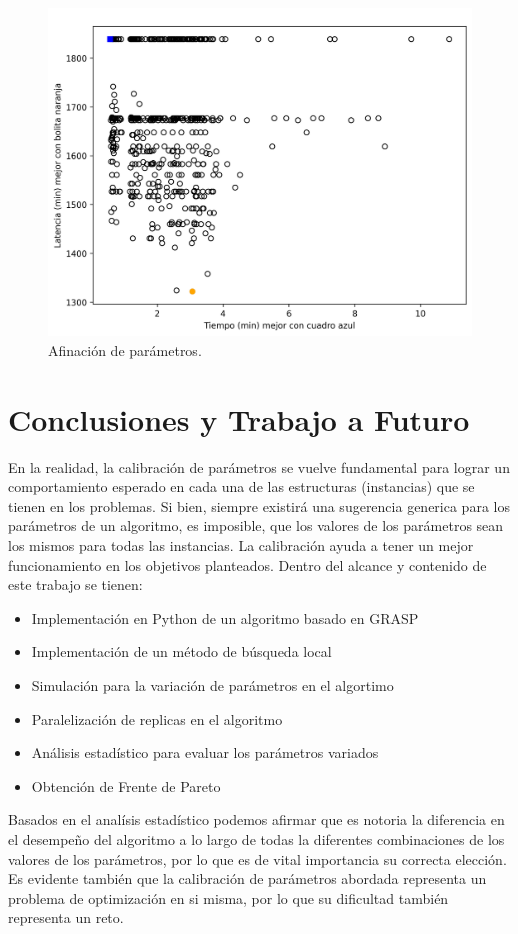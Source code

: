 \documentclass[review]{elsarticle}
\begin{document}
 \begin{figure}[h!]
	\centering
	\includegraphics[width=0.7\linewidth]{10_A_mejores.png}
	\caption{Afinación de parámetros.}
	\label{fig:imagen4}
	
\end{figure}



\section{Conclusiones y Trabajo a Futuro}

En la realidad, la calibración de parámetros se vuelve fundamental para lograr un comportamiento esperado en cada una de las estructuras (instancias) que se tienen en los problemas. Si bien, siempre existirá una sugerencia generica para los parámetros de un algoritmo, es imposible, que los valores de los parámetros sean los mismos para todas las instancias. La calibración ayuda a tener un mejor funcionamiento en los objetivos planteados.
Dentro del alcance y contenido de este trabajo se tienen:	
\begin{itemize}
\item Implementación en Python de un algoritmo basado en GRASP
\item Implementación de un método de búsqueda local
\item Simulación para la variación de parámetros en el algortimo
\item Paralelización de replicas en el algoritmo
\item Análisis estadístico para evaluar los parámetros variados
\item Obtención de Frente de Pareto
\end{itemize}

Basados en el analísis estadístico podemos afirmar que es notoria la diferencia en el desempeño del algoritmo a lo largo de todas la diferentes combinaciones de los valores de los parámetros, por lo que es de vital importancia su correcta elección.  Es evidente también que la calibración de parámetros abordada representa un problema de optimización en si misma, por lo que su dificultad también representa un reto.
\end{document}
